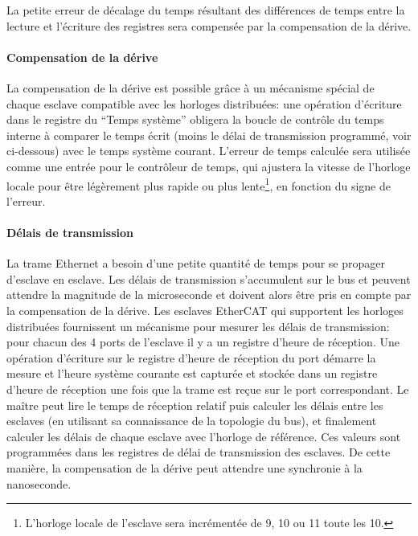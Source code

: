 \documentclass[a4paper,12pt,BCOR6mm,bibtotoc,idxtotoc]{scrbook}
\begin{document}
La petite erreur de d\'ecalage du temps r\'esultant des diff\'erences
de temps entre la lecture et l'\'ecriture des registres sera compens\'ee
par la compensation de la d\'erive.

\paragraph{Compensation de la d\'erive} La compensation de la d\'erive
est possible gr\^ace \`a un m\'ecanisme sp\'ecial de chaque esclave
compatible avec les horloges distribu\'ees: une op\'eration
d'\'ecriture dans le registre du ``Temps syst\`eme'' obligera la boucle
de contr\^ole du temps interne \`a comparer le temps \'ecrit (moins le
d\'elai de transmission programm\'e, voir ci-dessous) avec le temps
syst\`eme courant.  L'erreur de temps calcul\'ee sera utilis\'ee comme
une entr\'ee pour le contr\^oleur de temps, qui ajustera la vitesse de
l'horloge locale pour \^etre l\'eg\`erement plus rapide ou plus
lente\footnote{ L'horloge locale de l'esclave sera incr\'ement\'ee de
\unit{9}{\nano\second}, \unit{10}{\nano\second} ou
\unit{11}{\nano\second} toute les \unit{10}{\nano\second}.}, en
fonction du signe de l'erreur.

\paragraph{D\'elais de transmission} La trame Ethernet a besoin
d'une petite quantit\'e de temps pour se propager d'esclave en
esclave.  Les d\'elais de transmission s'accumulent sur le bus et
peuvent attendre la magnitude de la microseconde et doivent alors
\^etre pris en compte par la compensation de la d\'erive.  Les
esclaves EtherCAT qui supportent les horloges distribu\'ees
fournissent un m\'ecanisme pour mesurer les d\'elais de transmission:
pour chacun des 4 ports de l'esclave il y a un registre d'heure de
r\'eception.  Une op\'eration d'\'ecriture sur le registre d'heure de
r\'eception du port d\'emarre la mesure et l'heure syst\`eme courante
est captur\'ee et stock\'ee dans un registre d'heure de r\'eception
une fois que la trame est re\c{c}ue sur le port correspondant.  Le
ma\^itre peut lire le temps de r\'eception relatif puis calculer les
d\'elais entre les esclaves (en utilisant sa connaissance de la
topologie du bus), et finalement calculer les d\'elais de chaque
esclave avec l'horloge de r\'ef\'erence.  Ces valeurs sont
programm\'ees dans les registres de d\'elai de transmission des
esclaves. De cette mani\`ere, la compensation de la d\'erive peut
attendre une synchronie \`a la nanoseconde.
\end{document}
